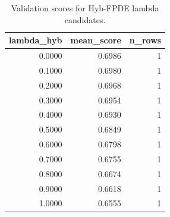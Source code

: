 \begin{table}[t]
\caption{Validation scores for Hyb-FPDE lambda candidates.}
\label{tab:lambda_distribution_computed}
\centering
\begin{tabular}{rrr}
\toprule
lambda\_hyb & mean\_score & n\_rows \\
\midrule
0.0000 & 0.6986 & 1 \\
0.1000 & 0.6980 & 1 \\
0.2000 & 0.6968 & 1 \\
0.3000 & 0.6954 & 1 \\
0.4000 & 0.6930 & 1 \\
0.5000 & 0.6849 & 1 \\
0.6000 & 0.6798 & 1 \\
0.7000 & 0.6755 & 1 \\
0.8000 & 0.6674 & 1 \\
0.9000 & 0.6618 & 1 \\
1.0000 & 0.6555 & 1 \\
\bottomrule
\end{tabular}

\end{table}

